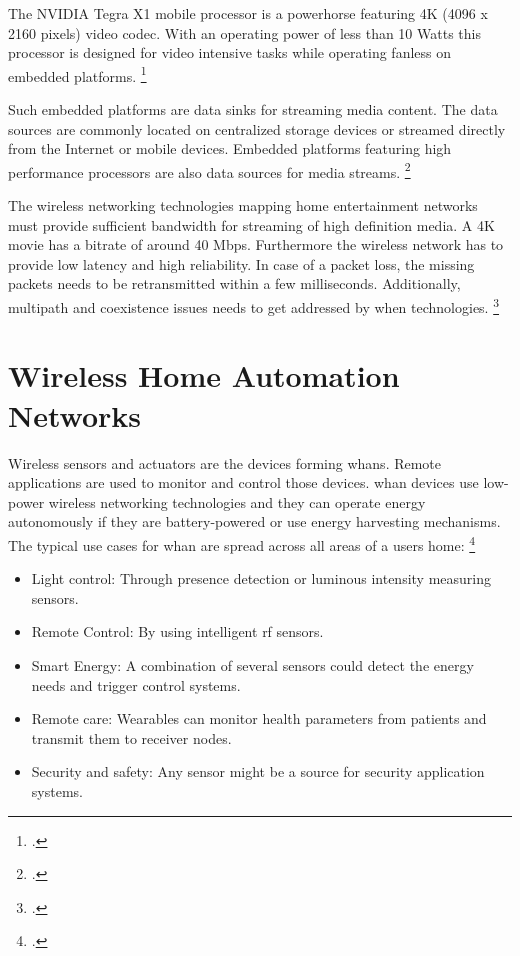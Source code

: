 The NVIDIA Tegra X1 mobile processor is a powerhorse featuring 4K (4096 x 2160 pixels) video codec. With an operating power of less than 10 Watts this processor is designed for video intensive tasks while operating fanless on embedded platforms. \footcite[Cf.][]{tegrax12015}

Such embedded platforms are data sinks for streaming media content. The data sources are commonly located on centralized storage devices or streamed directly from the Internet or mobile devices. Embedded platforms featuring high performance processors are also data sources for media streams. \footcite[Cf.][123]{Augusto2006}

The wireless networking technologies mapping home entertainment networks must provide sufficient bandwidth for streaming of high definition media. A 4K movie has a bitrate of around 40 Mbps. Furthermore the wireless network has to provide low latency and high reliability. In case of a packet loss, the missing packets needs to be retransmitted within a few milliseconds. Additionally, multipath and coexistence issues needs to get addressed by \gls{when} technologies. \footcite[Cf.][]{arris2014}

\section{Wireless Home Automation Networks}

Wireless sensors and actuators are the devices forming \glspl{whan}. Remote applications are used to monitor and control those devices. \gls{whan} devices use low-power wireless networking technologies and they can operate energy autonomously if they are battery-powered or use energy harvesting mechanisms. The typical use cases for \gls{whan} are spread across all areas of a users home: \footcite[Cf.][]{Gomez2010}

\begin{itemize}
  \item Light control: Through presence detection or luminous intensity measuring sensors.
  \item Remote Control: By using intelligent \gls{rf} sensors.
  \item Smart Energy: A combination of several sensors could detect the energy needs and trigger control systems.
  \item Remote care: Wearables can monitor health parameters from patients and transmit them to receiver nodes.
  \item Security and safety: Any sensor might be a source for security application systems.
\end{itemize}

